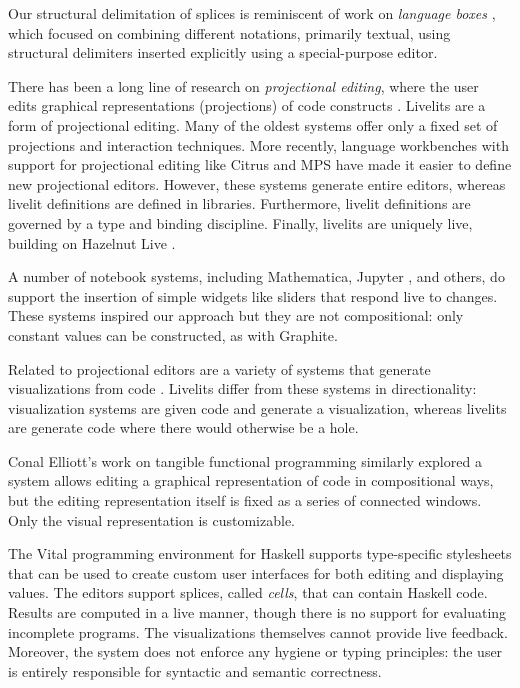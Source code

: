 Our structural delimitation of splices is reminiscent of work on 
\emph{language boxes} \cite{DBLP:conf/sle/RenggliDN09}, which focused on 
combining different notations, primarily textual, using structural delimiters inserted 
explicitly using a special-purpose editor. 

There has been a long line of research on \emph{projectional editing}, where
the user edits graphical representations (projections) of code constructs 
\cite{DBLP:journals/ile/MillerPMV94,read1996generating,DBLP:conf/sde/Reiss84,DBLP:conf/uist/KoM05}. Livelits are a form of projectional editing. 
Many of the oldest systems offer only a fixed set of projections and interaction techniques. 
More recently, language workbenches with support for projectional editing like Citrus \cite{DBLP:conf/uist/KoM05}
and MPS \cite{voelter2011language} have made it easier to define new projectional editors.
However, these systems generate entire editors, whereas livelit definitions 
are defined in libraries. 
Furthermore, livelit definitions are governed by a type and binding discipline.
Finally, livelits are uniquely live, building on Hazelnut Live \cite{HazelnutLive}.

A number of notebook systems, including Mathematica, Jupyter \cite{Guo13}, and others, do 
support the insertion of simple widgets like sliders that respond live to changes.
These systems inspired our approach but they are not compositional: only constant values can be constructed, as with Graphite.

Related to projectional editors are 
a variety of systems that generate visualizations from code \cite{DBLP:conf/chi/Lerner20,koschke2003software,urquiza2004survey}. Livelits differ 
from these systems in directionality: visualization systems are given code and generate
a visualization, whereas livelits are generate code where there would otherwise
be a hole.

Conal Elliott's work on tangible functional programming \cite{DBLP:conf/icfp/Elliott07} similarly explored a
system allows editing a graphical representation of code in compositional ways, 
but the editing representation itself is fixed as a series of connected windows.
Only the visual representation is customizable.

The Vital programming environment for Haskell \cite{hanna2002interactive} 
supports type-specific stylesheets
that can be used to create custom user interfaces for both editing and displaying
values. The editors support splices, called \emph{cells}, that can contain 
Haskell code. Results are computed in a live manner, though there is no support
for evaluating incomplete programs. The visualizations themselves cannot provide
live feedback. Moreover, the system does not enforce any hygiene or typing principles:
the user is entirely responsible for syntactic and semantic correctness.


